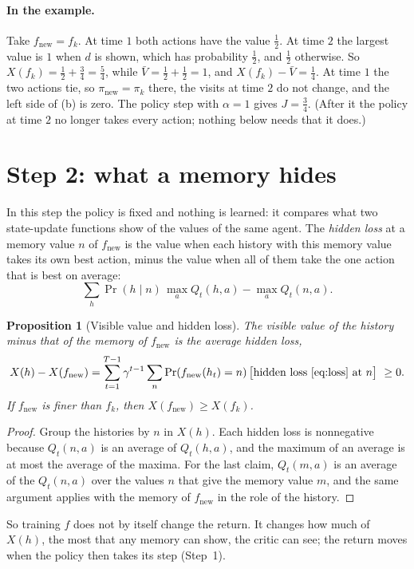\documentclass[11pt]{article}
\newtheorem{proposition}{Proposition}
\theoremstyle{definition}
\newcommand{\fn}{f_{\mathrm{new}}}
\newcommand{\pn}{\pi_{\mathrm{new}}}
\begin{document}
\paragraph{In the example.} Take $\fn=f_k$. At time $1$ both actions have the value $\tfrac12$. At time $2$ the largest value is $1$ when $d$ is shown, which has probability $\tfrac12$, and $\tfrac12$ otherwise. So $X(f_k)=\tfrac12+\tfrac34=\tfrac54$, while $\bar V=\tfrac12+\tfrac12=1$, and $X(f_k)-\bar V=\tfrac14$. At time $1$ the two actions tie, so $\pn=\pi_k$ there, the visits at time $2$ do not change, and the left side of (b) is zero. The policy step with $\alpha=1$ gives $J=\tfrac34$. (After it the policy at time $2$ no longer takes every action; nothing below needs that it does.)

\section{Step 2: what a memory hides}

In this step the policy is fixed and nothing is learned: it compares what two state-update functions show of the values of the same agent. The \emph{hidden loss} at a memory value $n$ of $\fn$ is the value when each history with this memory value takes its own best action, minus the value when all of them take the one action that is best on average:
\begin{equation}\label{eq:loss}
\sum_h\Pr(h\mid n)\,\max_aQ_t(h,a)-\max_aQ_t(n,a).
\end{equation}

\begin{proposition}[Visible value and hidden loss]\label{prop:hide}
The visible value of the history minus that of the memory of $\fn$ is the average hidden loss,
\[
X(h)-X(\fn)=\sum_{t=1}^{T-1}\gamma^{t-1}\sum_n\Pr(\fn(h_t)=n)\,\big[\text{hidden loss \eqref{eq:loss} at }n\big]\ \ge0 .
\]
If $\fn$ is finer than $f_k$, then $X(\fn)\ge X(f_k)$.
\end{proposition}
\begin{proof}
Group the histories by $n$ in $X(h)$. Each hidden loss is nonnegative because $Q_t(n,a)$ is an average of $Q_t(h,a)$, and the maximum of an average is at most the average of the maxima. For the last claim, $Q_t(m,a)$ is an average of the $Q_t(n,a)$ over the values $n$ that give the memory value $m$, and the same argument applies with the memory of $\fn$ in the role of the history.
\end{proof}

So training $f$ does not by itself change the return. It changes how much of $X(h)$, the most that any memory can show, the critic can see; the return moves when the policy then takes its step (Step~1).
\end{document}
